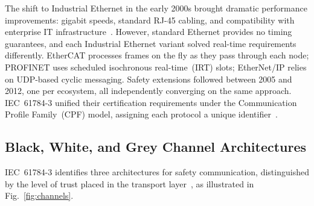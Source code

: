 \documentclass[conference]{IEEEtran}
\begin{document}
The shift to Industrial Ethernet in the early 2000s brought dramatic
performance improvements: gigabit speeds, standard RJ-45 cabling, and
compatibility with enterprise IT infrastructure~\cite{MoyneTilbury2007}.
However, standard Ethernet provides no timing guarantees, and each
Industrial Ethernet variant solved real-time requirements differently.
EtherCAT processes frames on the fly as they pass through each node;
PROFINET uses scheduled isochronous real-time~(IRT) slots; EtherNet/IP
relies on UDP-based cyclic messaging. Safety extensions followed between
2005 and 2012, one per ecosystem, all independently converging on the
same approach. IEC~61784-3 unified their certification requirements
under the Communication Profile Family~(CPF) model, assigning each
protocol a unique identifier~\cite{IEC617843}.

\subsection{Black, White, and Grey Channel Architectures}
\label{sec:channels}

IEC~61784-3 identifies three architectures for safety communication,
distinguished by the level of trust placed in the transport
layer~\cite{IEC617843}, as illustrated in Fig.~\ref{fig:channels}.
\end{document}
